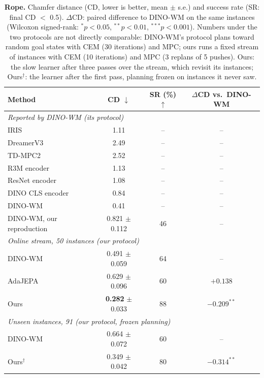 
\begin{table}[t]
\centering
\small
\caption{\textbf{Rope.} Chamfer distance (CD, lower is better, mean $\pm$ s.e.) and success rate (SR: final CD $<$ 0.5). $\Delta$CD: paired difference to DINO-WM on the same instances (Wilcoxon signed-rank: $^{*}p<0.05$, $^{**}p<0.01$, $^{***}p<0.001$). Numbers under the two protocols are not directly comparable: DINO-WM's protocol plans toward random goal states with CEM (30 iterations) and MPC; ours runs a fixed stream of instances with CEM (10 iterations) and MPC (3 replans of 5 pushes). Ours: the slow learner after three passes over the stream, which revisit its instances; Ours$^\dagger$: the learner after the first pass, planning frozen on instances it never saw.}
\label{tab:rope}
\begin{tabular}{lccc}
\toprule
Method & CD $\downarrow$ & SR (\%) $\uparrow$ & $\Delta$CD vs.\ DINO-WM \\
\midrule
\multicolumn{4}{l}{\textit{Reported by DINO-WM (its protocol)}} \\
\quad IRIS & 1.11 & -- & -- \\
\quad DreamerV3 & 2.49 & -- & -- \\
\quad TD-MPC2 & 2.52 & -- & -- \\
\quad R3M encoder & 1.13 & -- & -- \\
\quad ResNet encoder & 1.08 & -- & -- \\
\quad DINO CLS encoder & 0.84 & -- & -- \\
\quad DINO-WM & 0.41 & -- & -- \\
\quad DINO-WM, our reproduction & 0.821 $\pm$ 0.112 & 46 & -- \\
\midrule
\multicolumn{4}{l}{\textit{Online stream, 50 instances (our protocol)}} \\
\quad DINO-WM & 0.491 $\pm$ 0.059 & 64 & -- \\
\quad AdaJEPA & 0.629 $\pm$ 0.096 & 60 & $+0.138$ \\
\quad Ours & \textbf{0.282} $\pm$ 0.033 & 88 & $-0.209^{**}$ \\
\midrule
\multicolumn{4}{l}{\textit{Unseen instances, 91 (our protocol, frozen planning)}} \\
\quad DINO-WM & 0.664 $\pm$ 0.072 & 60 & -- \\
\quad Ours$^\dagger$ & 0.349 $\pm$ 0.042 & 80 & $-0.314^{**}$ \\
\bottomrule
\end{tabular}
\end{table}

